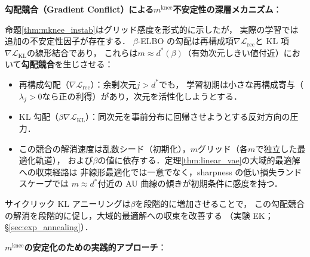 \documentclass[11pt,a4paper]{jsarticle}
\newcommand{\mknee}{m^{\mathrm{knee}}}
\begin{document}
\textbf{勾配競合（Gradient Conflict）による$\mknee$不安定性の深層メカニズム}：

命題\ref{thm:mknee_instab}はグリッド感度を形式的に示したが，
実際の学習では追加の不安定性因子が存在する．
$\beta$-ELBO の勾配は再構成項$\nabla\mathcal{L}_\mathrm{rec}$と
KL 項$\nabla\mathcal{L}_\mathrm{KL}$の線形結合であり，
これらは$m \approx d^*(\beta)$（有効次元しきい値付近）において\textbf{勾配競合}を生じさせる：

\begin{itemize}
  \item 再構成勾配（$\nabla\mathcal{L}_\mathrm{rec}$）：余剰次元$j > d^*$でも，
        学習初期は小さな再構成寄与（$\lambda_j > 0$なら正の利得）があり，次元を活性化しようとする．
  \item KL 勾配（$\beta\nabla\mathcal{L}_\mathrm{KL}$）：同次元を事前分布に回帰させようとする反対方向の圧力．
  \item この競合の解消速度は乱数シード（初期化），$m$グリッド（各$m$で独立した最適化軌道），
        および$\beta$の値に依存する．定理\ref{thm:linear_vae}の大域的最適解への収束経路は
        非線形最適化では一意でなく，sharpness の低い損失ランドスケープでは
        $m \approx d^*$付近の AU 曲線の傾きが初期条件に感度を持つ．
\end{itemize}

サイクリック KL アニーリング\cite{fu2019cyclical}は$\beta$を段階的に増加させることで，
この勾配競合の解消を段階的に促し，大域的最適解への収束を改善する
（実験 EK；§\ref{sec:exp_annealing}）．

\textbf{$\mknee$の安定化のための実践的アプローチ}：
\end{document}
